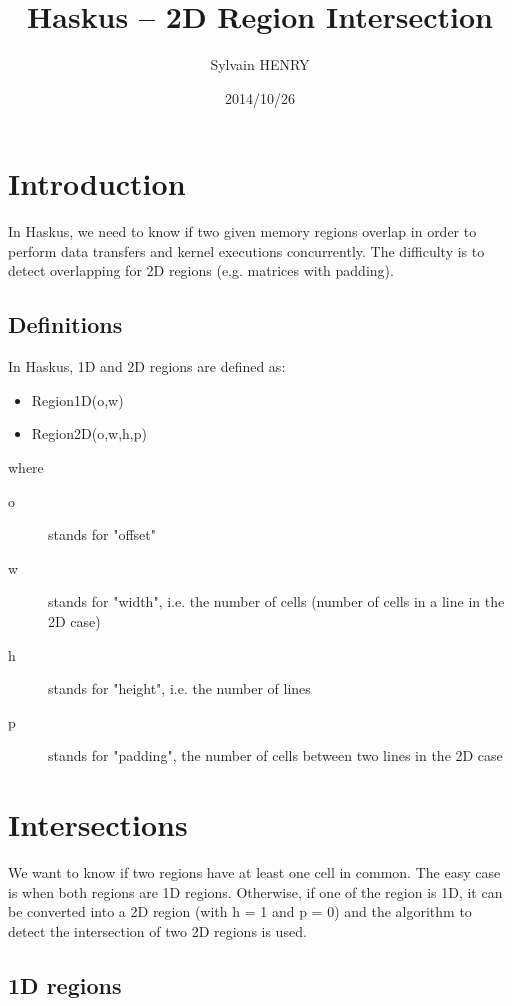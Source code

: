\documentclass[twocolumn]{article}
\begin{document}
\title{Haskus -- 2D Region Intersection}
\author{Sylvain HENRY}
\date{2014/10/26}


\maketitle

\section{Introduction}

In Haskus, we need to know if two given memory regions overlap in order to
perform data transfers and kernel executions concurrently. The difficulty is to
detect overlapping for 2D regions (e.g. matrices with padding).

\subsection{Definitions}

In Haskus, 1D and 2D regions are defined as:
\begin{itemize}
   \item Region1D(o,w)
   \item Region2D(o,w,h,p)
\end{itemize}
where
\begin{description}
   \item[o] stands for "offset"
   \item[w] stands for "width", i.e. the number of cells (number of cells in a line in the 2D case)
   \item[h] stands for "height", i.e. the number of lines
   \item[p] stands for "padding", the number of cells between two lines in the 2D
   case
\end{description}

\section{Intersections}

We want to know if two regions have at least one cell in common. The easy case
is when both regions are 1D regions. Otherwise, if one of the region is 1D, it
can be converted into a 2D region (with h = 1 and p = 0) and the algorithm to
detect the intersection of two 2D regions is used.

\subsection{1D regions}
\end{document}
